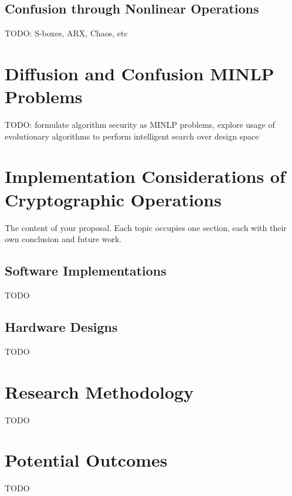 \documentclass[12pt]{article}
\begin{document}
\subsection{Confusion through Nonlinear Operations}
\label{ch:nonlinear}

TODO: S-boxes, ARX, Chaos, etc

\section{Diffusion and Confusion MINLP Problems}
\label{ch:opt}

TODO: formulate algorithm security as MINLP problems, explore usage of evolutionary algorithms to perform intelligent search over design space

\section{Implementation Considerations of Cryptographic Operations}
\label{ch:proposal}

The content of your proposal. Each topic occupies one section, each with their own conclusion and future work.

\subsection{Software Implementations}
\label{ch:swimpl}

TODO

\subsection{Hardware Designs}
\label{ch:hwimpl}

TODO

\section{Research Methodology}
\label{ch:methodology}

TODO

\section{Potential Outcomes}
\label{ch:outcomes}

TODO
\end{document}
